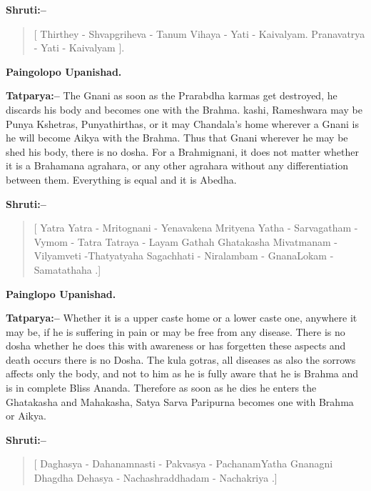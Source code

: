 \textbf{Shruti:–}

\begin{verse}
[ Thirthey - Shvapgriheva - Tanum Vihaya - Yati - Kaivalyam.  Pranavatrya - Yati - Kaivalyam ].
\end{verse}

\begin{flushright}
\textbf{Paingolopo Upanishad.}
\end{flushright}

\textbf{Tatparya:–} The Gnani as soon as the Prarabdha karmas get destroyed, he discards his body and becomes one with the Brahma. kashi, Rameshwara may be Punya Kshetras, Punyathirthas, or it may Chandala's home wherever a Gnani is he will become Aikya with the Brahma. Thus that Gnani wherever he may be shed his body, there is no dosha. For a Brahmignani, it does not matter whether it is a Brahamana agrahara, or any other agrahara without any differentiation between them. Everything is equal and it is Abedha.

\newpage

\textbf{Shruti:–}

\begin{verse}
[ Yatra Yatra - Mritognani - Yenavakena Mrityena  Yatha - Sarvagatham - Vymom - Tatra Tatraya - Layam Gathah  Ghatakasha Mivatmanam - Vilyamveti -Thatyatyaha  Sagachhati - Niralambam - GnanaLokam - Samatathaha .]
\end{verse}

\begin{flushright}
\textbf{Painglopo Upanishad.}
\end{flushright}

\textbf{Tatparya:–} Whether it is a upper caste home or a lower caste one, anywhere it may be, if he is suffering in pain or may be free from any disease. There is no dosha whether he does this with awareness or has forgetten these aspects and death occurs there is no Dosha. The kula gotras, all diseases as also the sorrows affects only the body, and not to him as he is fully aware that he is Brahma and is in complete Bliss Ananda. Therefore as soon as he dies he enters the Ghatakasha and Mahakasha, Satya Sarva Paripurna becomes one with Brahma or Aikya.

\textbf{Shruti:–}

\begin{verse}
[ Daghasya - Dahanamnasti - Pakvasya - Pachanam\break Yatha  Gnanagni Dhagdha Dehasya - Nacha\break shraddhadam - Nachakriya .]
\end{verse}

